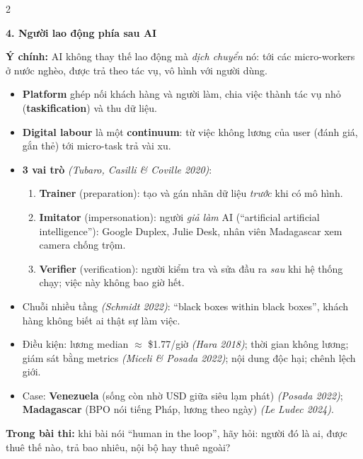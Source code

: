 \documentclass[10pt]{article}
\newcommand{\kw}[1]{\textbf{#1}}
\newcommand{\ct}[1]{{\color{h1}\itshape(#1)}}
\newcommand{\sect}[1]{\par\vspace{6pt}\noindent\colorbox{h1}{\parbox{\dimexpr\linewidth-2\fboxsep}{\large\bfseries\color{white}#1}}\par\vspace{2pt}}
\newcommand{\idea}[1]{\par\noindent\colorbox{bg}{\parbox{\dimexpr\linewidth-2\fboxsep}{\textbf{Ý chính:} #1}}\par}
\newcommand{\warn}[1]{\par\noindent\colorbox{wn}{\parbox{\dimexpr\linewidth-2\fboxsep}{\textbf{Trong bài thi:} #1}}\par}
\begin{document}
\begin{multicols}{2}
\sect{4. Người lao động phía sau AI}
\idea{AI không thay thế lao động mà \emph{dịch chuyển} nó: tới các micro-workers ở nước nghèo, được trả theo tác vụ, vô hình với người dùng.}
\begin{itemize}
\item \kw{Platform} ghép nối khách hàng và người làm, chia việc thành tác vụ nhỏ (\kw{taskification}) và thu dữ liệu.
\item \kw{Digital labour} là một \kw{continuum}: từ việc không lương của user (đánh giá, gắn thẻ) tới micro-task trả vài xu.
\item \textbf{3 vai trò} \ct{Tubaro, Casilli \& Coville 2020}:
\begin{enumerate}
\item \kw{Trainer} (preparation): tạo và gán nhãn dữ liệu \emph{trước} khi có mô hình.
\item \kw{Imitator} (impersonation): người \emph{giả làm} AI (``artificial artificial intelligence''): Google Duplex, Julie Desk, nhân viên Madagascar xem camera chống trộm.
\item \kw{Verifier} (verification): người kiểm tra và sửa đầu ra \emph{sau} khi hệ thống chạy; việc này không bao giờ hết.
\end{enumerate}
\item Chuỗi nhiều tầng \ct{Schmidt 2022}: ``black boxes within black boxes'', khách hàng không biết ai thật sự làm việc.
\item Điều kiện: lương median $\approx$ \$1.77/giờ \ct{Hara 2018}; thời gian không lương; giám sát bằng metrics \ct{Miceli \& Posada 2022}; nội dung độc hại; chênh lệch giới.
\item Case: \kw{Venezuela} (sống còn nhờ USD giữa siêu lạm phát) \ct{Posada 2022}; \kw{Madagascar} (BPO nói tiếng Pháp, lương theo ngày) \ct{Le Ludec 2024}.
\end{itemize}
\warn{khi bài nói ``human in the loop'', hãy hỏi: người đó là ai, được thuê thế nào, trả bao nhiêu, nội bộ hay thuê ngoài?}


\end{multicols}
\end{document}
